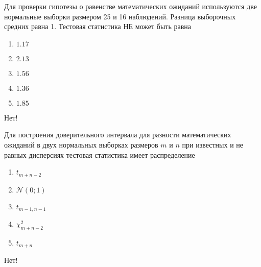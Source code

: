 \documentclass[t]{beamer}
\newcommand{\cN}{\mathcal{N}}
\begin{document}
 \begin{frame} \label{4-No} 
\begin{block}{4} 

  Для проверки гипотезы о равенстве математических ожиданий используются две нормальные выборки размером 25 и 16 наблюдений. Разница выборочных средних равна 1. Тестовая статистика НЕ может быть равна


 \end{block} 
\begin{enumerate} 
\item[] \hyperlink{4-No}{\beamergotobutton{} $1.17$}
\item[] \hyperlink{4-No}{\beamergotobutton{} $2.13$}
\item[] \hyperlink{4-No}{\beamergotobutton{} $1.56$}
\item[] \hyperlink{4-No}{\beamergotobutton{} $1.36$}
\item[] \hyperlink{4-No}{\beamergotobutton{} $1.85$}
\end{enumerate} 

 \alert{Нет!} 
\end{frame} 


 \begin{frame} \label{5-No} 
\begin{block}{5} 

  Для построения доверительного интервала для разности математических ожиданий в двух нормальных выборках размеров $m$ и $n$ при известных и не равных дисперсиях тестовая статистика имеет распределение


 \end{block} 
\begin{enumerate} 
\item[] \hyperlink{5-No}{\beamergotobutton{} $t_{m+n-2}$}
\item[] \hyperlink{5-Yes}{\beamergotobutton{} $\cN(0;1)$}
\item[] \hyperlink{5-No}{\beamergotobutton{} $t_{m-1,n-1}$}
\item[] \hyperlink{5-No}{\beamergotobutton{} $\chi^2_{m+n-2}$}
\item[] \hyperlink{5-No}{\beamergotobutton{} $t_{m+n}$}
\end{enumerate} 

 \alert{Нет!} 
\end{frame} 
\end{document}
